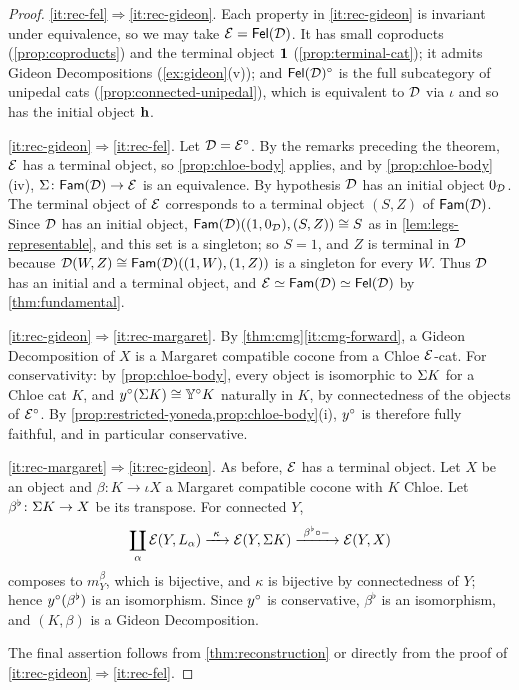 \begin{proof}
\ref{it:rec-fel}$\Rightarrow$\ref{it:rec-gideon}. Each property in
\ref{it:rec-gideon} is invariant under equivalence, so we may take
$\mathcal{E}=\mathsf{Fel}(\mathcal{D})$. It has small coproducts (\cref{prop:coproducts}) and the
terminal object $\mathbf{1}$ (\cref{prop:terminal-cat}); it admits Gideon
Decompositions (\cref{ex:gideon}(v)); and $\mathsf{Fel}(\mathcal{D})^\circ$ is the full
subcategory of unipedal cats (\cref{prop:connected-unipedal}), which is
equivalent to $\mathcal{D}$ via $\iota$ and so has the initial object $\mathbf{h}$.

\ref{it:rec-gideon}$\Rightarrow$\ref{it:rec-fel}. Let $\mathcal{D}=\mathcal{E}^\circ$. By the
remarks preceding the theorem, $\mathcal{E}$ has a terminal object, so
\cref{prop:chloe-body} applies, and by \cref{prop:chloe-body}(iv),
$\Sigma\colon\mathsf{Fam}(\mathcal{D})\to\mathcal{E}$ is an equivalence. By hypothesis $\mathcal{D}$ has an
initial object $0_{\mathcal{D}}$. The terminal object of $\mathcal{E}$
corresponds to a terminal object $(S,Z)$ of $\mathsf{Fam}(\mathcal{D})$. Since $\mathcal{D}$ has an
initial object, $\mathsf{Fam}(\mathcal{D})((1,0_{\mathcal{D}}),(S,Z))\cong S$ as in
\cref{lem:legs-representable}, and this set is a singleton; so $S=1$, and
$Z$ is terminal in $\mathcal{D}$ because $\mathcal{D}(W,Z)\cong\mathsf{Fam}(\mathcal{D})((1,W),(1,Z))$ is a
singleton for every $W$. Thus $\mathcal{D}$ has an initial and a terminal object, and
$\mathcal{E}\simeq\mathsf{Fam}(\mathcal{D})\simeq\mathsf{Fel}(\mathcal{D})$ by \cref{thm:fundamental}.

\ref{it:rec-gideon}$\Rightarrow$\ref{it:rec-margaret}. By \cref{thm:cmg}\ref{it:cmg-forward},
a Gideon Decomposition of $X$ is a Margaret compatible cocone from a Chloe
$\mathcal{E}$-cat. For conservativity: by \cref{prop:chloe-body}, every object is
isomorphic to $\Sigma K$ for a Chloe cat $K$, and $y^\circ(\Sigma K)\cong\mathbb{Y}^\circ K$
naturally in $K$, by connectedness of the objects of $\mathcal{E}^\circ$. By
\cref{prop:restricted-yoneda,prop:chloe-body}(i), $y^\circ$ is therefore fully
faithful, and in particular conservative.

\ref{it:rec-margaret}$\Rightarrow$\ref{it:rec-gideon}. As before, $\mathcal{E}$ has a
terminal object. Let $X$ be an object and
$\beta\colon K\to\iota X$ a Margaret compatible cocone with $K$ Chloe. Let
$\beta^\flat\colon\Sigma K\to X$ be its transpose. For connected $Y$,
\[
\coprod_\alpha\cE(Y,L_\alpha)\xrightarrow{\ \kappa\ }\cE(Y,\body K)\xrightarrow{\ \beta^\flat\circ-\ }\cE(Y,X)
\]
composes to $m^\beta_Y$, which is bijective, and $\kappa$ is bijective by
connectedness of $Y$; hence $y^\circ(\beta^\flat)$ is an isomorphism. Since
$y^\circ$ is conservative, $\beta^\flat$ is an isomorphism, and $(K,\beta)$ is a
Gideon Decomposition.

The final assertion follows from \cref{thm:reconstruction} or directly from the
proof of \ref{it:rec-gideon}$\Rightarrow$\ref{it:rec-fel}.
\end{proof}

